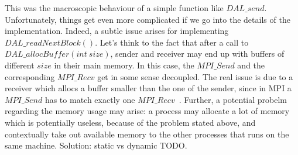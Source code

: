 This was the macroscopic behaviour of a simple function like $DAL\_send$. Unfortunately, things get even more complicated if we go into the details of the implementation. Indeed, a subtle issue arises for implementing $DAL\_readNextBlock( )$. Let's think to the fact that after a call to $DAL\_allocBuffer( int\ size )$, sender and receiver may end up with buffers of different $size$ in their main memory. In this case, the $MPI\_Send$ and the corresponding $MPI\_Recv$ get in some sense decoupled. The real issue is due to a receiver which allocs a buffer smaller than the one of the sender, since in MPI a $MPI\_Send$ has to match exactly one $MPI\_Recv$~\cite{MPI}. Further, a potential probelm regarding the memory usage may arise: a process may allocate a lot of memory which is potentially useless, because of the problem stated above, and contextually take out available memory to the other processes that runs on the same machine. Solution: static vs dynamic TODO.
